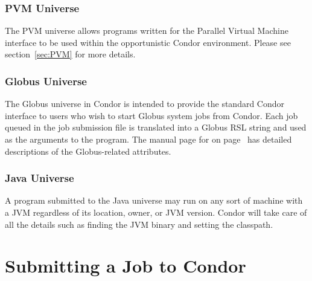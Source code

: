 \subsubsection{PVM Universe}

The PVM universe allows programs written for the Parallel Virtual Machine
interface to be used within the opportunistic Condor environment.
Please see section~\ref{sec:PVM} for more details.


\subsubsection{Globus Universe}

The Globus universe in Condor is intended to provide the standard
Condor interface to users who wish to start Globus system jobs
from Condor. Each job queued in the job submission file is translated
into a Globus RSL string and used as the arguments to the 
program. The manual page for 
on page~\pageref{man-condor-submit}
has detailed descriptions of
the Globus-related attributes.

\subsubsection{Java Universe}


A program submitted to the Java universe may run on any sort of machine
with a JVM regardless of its location, owner, or JVM version.  Condor
will take care of all the details such as finding the JVM binary and
setting the classpath.

\section{Submitting a Job to Condor}


